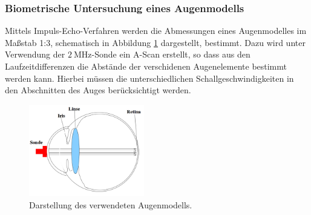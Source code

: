 \subsubsection{Biometrische Untersuchung eines Augenmodells}
Mittels Impuls-Echo-Verfahren werden die Abmessungen eines Augenmodelles im Maßstab 1:3, schematisch in Abbildung \ref{abb:3} dargestellt, bestimmt.
Dazu wird unter Verwendung der $\SI{2}{\mega\hertz}$-Sonde ein A-Scan erstellt, so dass aus den Laufzeitdifferenzen die Abstände der verschidenen Augenelemente bestimmt werden kann.
Hierbei müssen die unterschiedlichen Schallgeschwindigkeiten in den Abschnitten des Auges berücksichtigt werden.

\begin{figure}
  \centering
  \includegraphics[height=4cm]{ressources/eyeoftheebberg.png}
  \caption{Darstellung des verwendeten Augenmodells. \cite{skript}}
  \label{abb:3}
\end{figure}
